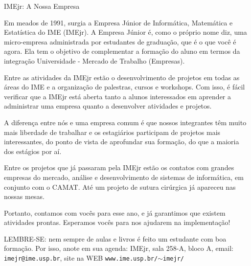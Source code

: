 \begin{secao}{IMEjr: A Nossa Empresa}

Em meados de 1991, surgia a Empresa Júnior de Informática, Matemática
e Estatística do IME (IMEjr). A Empresa Júnior é, como o próprio nome
diz, uma micro-empresa administrada por estudantes de graduação, que é
o que você é agora. Ela tem o objetivo de complementar a formação do
aluno em termos da integração Universidade - Mercado de Trabalho
(Empresas).

Entre as atividades da IMEjr estão o desenvolvimento de
projetos em todas as áreas do IME e a organização de palestras, cursos
e workshops. Com isso, é fácil verificar que a IMEjr está aberta tanto
a alunos interessados em aprender a administrar uma empresa quanto a
desenvolver atividades e projetos.

A diferença entre nós e uma
empresa comum é que nossos integrantes têm muito mais liberdade de
trabalhar e os estagiários participam de projetos mais interessantes,
do ponto de vista de aprofundar sua formação, do que a maioria dos
estágios por aí.

Entre os projetos que já passaram pela IMEjr estão
os contatos com grandes empresas do mercado, análise e desenvolvimento
de sistemas de informática,  em conjunto com o CAMAT. Até um projeto
de sutura cirúrgica já apareceu nas nossas mesas.

Portanto, contamos
com vocês para esse ano, e já garantimos que existem atividades
prontas. Esperamos vocês para nos ajudarem na implementação!

LEMBRE-SE: nem sempre de aulas e livros é feito um estudante com boa
formação. Por isso, anote em sua agenda: IMEjr, sala 258-A, bloco A,
email: {\tt imejr@ime.usp.br}, site na WEB
{\tt www.ime.usp.br/$\sim$imejr/}

\end{secao}

